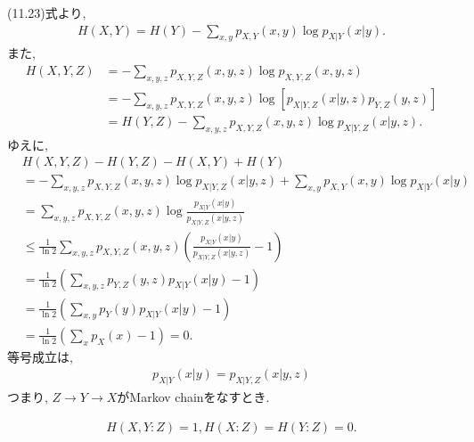 \begin{ex}
    \label{ex11.6}
    (11.23)式より,
    \begin{align*}
        H(X, Y) = H(Y) - \sum_{x,y}p_{X,Y}(x,y) \log p_{X|Y}(x|y).
    \end{align*}
    また,
    \begin{align*}
        H(X,Y,Z)
         & = - \sum_{x,y,z} p_{X,Y,Z}(x,y,z)\log  p_{X,Y,Z}(x,y,z)                           \\
         & = - \sum_{x,y,z} p_{X,Y,Z}(x,y,z)\log \left[ p_{X|Y,Z}(x|y,z) p_{Y,Z}(y,z)\right] \\
         & = H(Y,Z) - \sum_{x,y,z} p_{X,Y,Z}(x,y,z)\log p_{X|Y,Z}(x|y,z).
    \end{align*}
    ゆえに,
    \begin{align*}
         & H(X,Y,Z) - H(Y,Z) - H(X,Y) + H(Y)                                       \\
         & =
        - \sum_{x,y,z} p_{X,Y,Z}(x,y,z)\log p_{X|Y,Z}(x|y,z)
        + \sum_{x,y}p_{X,Y}(x,y) \log p_{X|Y}(x|y)                                 \\
         & =
        \sum_{x, y, z}  p_{X,Y,Z}(x,y,z)\log \frac{p_{X|Y}(x|y)}{p_{X|Y,Z}(x|y,z)} \\
         & \leq
        \frac{1}{\ln2}\sum_{x, y, z}  p_{X,Y,Z}(x,y,z)
        \left( \frac{p_{X|Y}(x|y)}{p_{X|Y,Z}(x|y,z)} - 1 \right)                   \\
         & =
        \frac{1}{\ln2} \left( \sum_{x, y, z} p_{Y,Z}(y,z) p_{X|Y}(x|y) - 1 \right) \\
         & =
        \frac{1}{\ln2} \left( \sum_{x, y} p_{Y}(y) p_{X|Y}(x|y) - 1 \right)        \\
         & =
        \frac{1}{\ln2} \left( \sum_{x} p_{X}(x) - 1 \right) = 0.
    \end{align*}
    等号成立は,
    \begin{align*}
        p_{X|Y}(x|y) = p_{X|Y,Z}(x|y,z)
    \end{align*}
    つまり, $Z \to Y \to X$がMarkov chainをなすとき.
\end{ex}

\begin{ex}
    \label{ex11.7}
\end{ex}

\begin{ex}
    \label{ex11.8}
    \begin{align*}
        H(X, Y : Z) = 1, H(X:Z) = H(Y:Z) = 0.
    \end{align*}
\end{ex}

